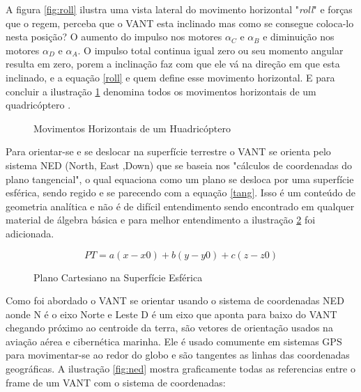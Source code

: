 A figura \ref{fig:roll} ilustra uma vista lateral do movimento horizontal "\textit{roll}" e forças que o regem, perceba que o VANT esta inclinado mas como se consegue coloca-lo nesta posição? O aumento do impulso nos motores $\alpha_{C}$ e $\alpha_{B}$ e diminuição nos motores $\alpha_{D}$ e $\alpha_{A}$. O impulso total continua igual zero ou seu momento angular resulta em zero, porem a inclinação faz com que ele vá na direção em que esta inclinado, e a equação \ref{roll} e quem define esse movimento horizontal.
E para concluir a ilustração \ref{fig:dirdrone} denomina todos os movimentos horizontais de um quadricóptero \cite{calcmov}.  

\begin{figure}[H]
	\centering
	\caption{Movimentos Horizontais de um Huadricóptero}
	\fontsize{9pt}{12pt}\selectfont
	\def\svgwidth{15cm}
	
	\label{fig:dirdrone}
\end{figure}

Para orientar-se e se deslocar na superfície terrestre o VANT se orienta pelo sistema NED (North, East ,Down) que se baseia nos "cálculos de coordenadas do plano tangencial", o qual equaciona como um plano se desloca por uma superfície esférica, sendo regido e se parecendo com a equação \ref{tang}. Isso é um conteúdo de geometria analítica e não é de difícil entendimento sendo encontrado em qualquer material de álgebra básica e para melhor entendimento a ilustração \ref{fig:planacart} foi adicionada.  

\begin{equation}
	\label{tang}
	PT=a\left(x-x0\right)+b\left(y-y0\right)+c\left(z-z0\right)
\end{equation}

\begin{figure}[H]
	\centering
	\caption{Plano Cartesiano na Superfície Esférica}
	\fontsize{9pt}{12pt}\selectfont
	\color{black}
	\def\svgwidth{15cm}
	
	\label{fig:planacart}
\end{figure}

Como foi abordado o VANT se orientar usando o sistema de coordenadas NED aonde N é o eixo Norte e Leste D é um eixo que aponta para baixo do VANT chegando próximo ao centroide da terra, são vetores de orientação usados na aviação aérea e cibernética marinha. Ele é usado comumente em sistemas GPS para movimentar-se ao redor do globo e são tangentes as linhas das coordenadas geográficas. A ilustração \ref{fig:ned} mostra graficamente todas as referencias entre o frame de um VANT com o sistema de coordenadas:

